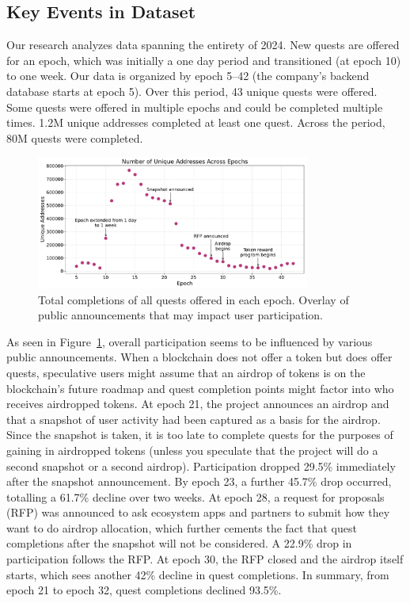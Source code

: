 
\subsection{Key Events in Dataset}

Our research analyzes data spanning the entirety of 2024. New quests are offered for an epoch, which was initially a one day period and transitioned (at epoch 10) to one week. Our data is organized by epoch 5--42 (the company's backend database starts at epoch 5). Over this period, 43 unique quests were offered. Some quests were offered in multiple epochs and could be completed multiple times. 1.2M unique addresses completed at least one quest.  Across the period, 80M quests were completed.

\begin{figure}[t]
    \centering
    \includegraphics[width=0.8\textwidth]{figures/events.pdf}
    \caption{Total completions of all quests offered in each epoch. Overlay of public announcements that may impact user participation.}
    \label{fig:events}
\end{figure}

As seen in  Figure~\ref{fig:events}, overall participation seems to be influenced by various public announcements. When a blockchain does not offer a token but does offer quests, speculative users might assume that an airdrop of tokens is on the blockchain's future roadmap and quest completion points might factor into who receives airdropped tokens. At epoch 21, the project announces an airdrop and that a snapshot of user activity had been captured as a basis for the airdrop. Since the snapshot is taken, it is too late to complete quests for the purposes of gaining in airdropped tokens (unless you speculate that the project will do a second snapshot or a second airdrop). Participation dropped 29.5\% immediately after the snapshot announcement. By epoch 23, a further 45.7\% drop occurred, totalling a 61.7\% decline over two weeks. At epoch 28, a request for proposals (RFP) was announced to ask ecosystem apps and partners to submit how they want to do airdrop allocation, which further cements the fact that quest completions after the snapshot will not be considered. A 22.9\% drop in participation follows the RFP. At epoch 30, the RFP closed and the airdrop itself starts, which sees another 42\% decline in quest completions. In summary, from epoch 21 to epoch 32, quest completions declined 93.5\%.  

